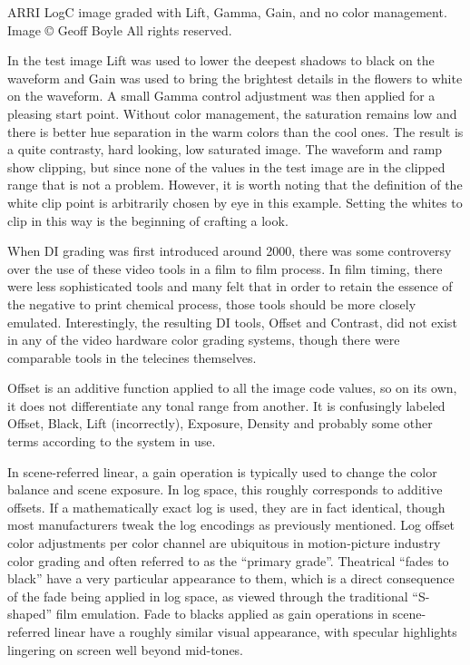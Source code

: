 ARRI LogC image graded with Lift, Gamma, Gain, and no color management. Image © Geoff Boyle All rights reserved.

In the test image Lift was used to lower the deepest shadows to black on the waveform and Gain was used to bring the brightest details in the flowers to white on the waveform. A small Gamma control adjustment was then applied for a pleasing start point. Without color management, the saturation remains low and there is better hue separation in the warm colors than the cool ones. The result is a quite contrasty, hard looking, low saturated image. The waveform and ramp show clipping, but since none of the values in the test image are in the clipped range that is not a problem. However, it is worth noting that the definition of the white clip point is arbitrarily chosen by eye in this example. Setting the whites to clip in this way is the beginning of crafting a look.

When DI grading was first introduced around 2000, there was some controversy over the use of these video tools in a film to film process. In film timing, there were less sophisticated tools and many felt that in order to retain the essence of the negative to print chemical process, those tools should be more closely emulated. Interestingly, the resulting DI tools, Offset and Contrast, did not exist in any of the video hardware color grading systems, though there were comparable tools in the telecines themselves.

Offset is an additive function applied to all the image code values, so on its own, it does not differentiate any tonal range from another. It is confusingly labeled Offset, Black, Lift (incorrectly), Exposure, Density and probably some other terms according to the system in use. 

In scene-referred linear, a gain operation is typically used to change the color balance and scene exposure. In log space, this roughly corresponds to additive offsets. If a mathematically exact log is used, they are in fact identical, though most manufacturers tweak the log encodings as previously mentioned. Log offset color adjustments per color channel are ubiquitous in motion-picture industry color grading and often referred to as the “primary grade”. Theatrical “fades to black” have a very particular appearance to them, which is a direct consequence of the fade being applied in log space, as viewed through the traditional “S-shaped” film emulation. Fade to blacks applied as gain operations in scene-referred linear have a roughly similar visual appearance, with specular highlights lingering on screen well beyond mid-tones.

